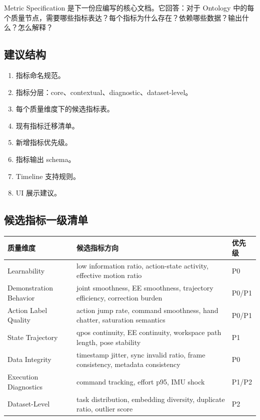 \documentclass[UTF8,zihao=-4]{ctexart}
\begin{document}
Metric Specification 是下一份应编写的核心文档。它回答：对于 Ontology 中的每个质量节点，需要哪些指标表达？每个指标为什么存在？依赖哪些数据？输出什么？怎么解释？

\subsection{建议结构}

\begin{enumerate}
  \item 指标命名规范。
  \item 指标分层：core、contextual、diagnostic、dataset-level。
  \item 每个质量维度下的候选指标表。
  \item 现有指标迁移清单。
  \item 新增指标优先级。
  \item 指标输出 schema。
  \item Timeline 支持规则。
  \item UI 展示建议。
\end{enumerate}

\subsection{候选指标一级清单}

\begin{longtable}{L{4cm} L{5.5cm} L{4.8cm}}
\toprule
质量维度 & 候选指标方向 & 优先级 \\
\midrule
Learnability & low information ratio, action-state activity, effective motion ratio & P0 \\
Demonstration Behavior & joint smoothness, EE smoothness, trajectory efficiency, correction burden & P0/P1 \\
Action Label Quality & action jump rate, command smoothness, hand chatter, saturation semantics & P0/P1 \\
State Trajectory & qpos continuity, EE continuity, workspace path length, pose stability & P1 \\
Data Integrity & timestamp jitter, sync invalid ratio, frame consistency, metadata consistency & P0 \\
Execution Diagnostics & command tracking, effort p95, IMU shock & P1/P2 \\
Dataset-Level & task distribution, embedding diversity, duplicate ratio, outlier score & P2 \\
\bottomrule
\end{longtable}
\end{document}

